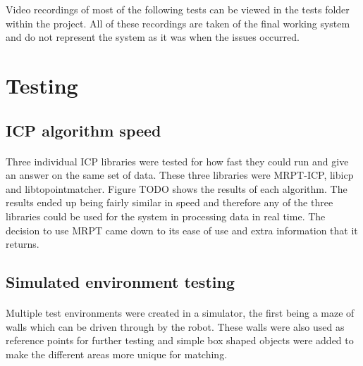 Video recordings of most of the following tests can be viewed in the tests folder within the project. All of these recordings are taken of the final working system and do not represent the system as it was when the issues occurred.


\section{Testing}
\subsection{ICP algorithm speed}
\paragraph{}
Three individual ICP libraries were tested for how fast they could run and give an answer on the same set of data. These three libraries were MRPT-ICP, libicp and libtopointmatcher. Figure TODO shows the results of each algorithm. The results ended up being fairly similar in speed and therefore any of the three libraries could be used for the system in processing data in real time. The decision to use MRPT came down to its ease of use and extra information that it returns.

\subsection{Simulated environment testing}
\paragraph{}
Multiple test environments were created in a simulator, the first being a maze of walls which can be driven through by the robot. These walls were also used as reference points for further testing and simple box shaped objects were added to make the different areas more unique for matching.


